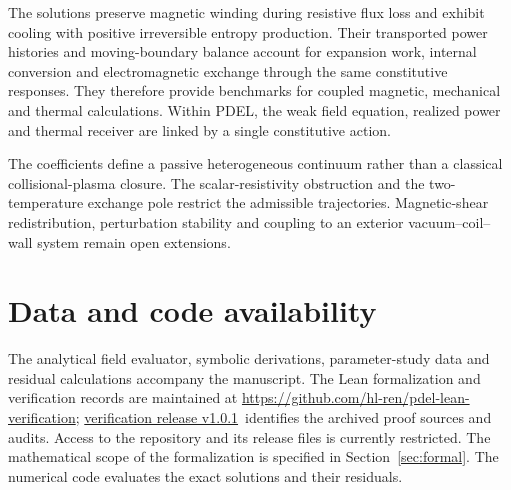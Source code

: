 \documentclass[11pt,a4paper]{article}
\theoremstyle{remark}\newtheorem{remark}{Remark}
\numberwithin{equation}{section}
\newcommand{\repositoryurl}{\url{https://github.com/hl-ren/pdel-lean-verification}}
\newcommand{\repositoryarchive}{\href{https://github.com/hl-ren/pdel-lean-verification/releases/tag/v1.0.1}{verification release v1.0.1}}
\begin{document}
The solutions preserve magnetic winding during resistive flux loss and exhibit cooling with positive irreversible entropy production. Their transported power histories and moving-boundary balance account for expansion work, internal conversion and electromagnetic exchange through the same constitutive responses. They therefore provide benchmarks for coupled magnetic, mechanical and thermal calculations. Within PDEL, the weak field equation, realized power and thermal receiver are linked by a single constitutive action.

The coefficients define a passive heterogeneous continuum rather than a classical collisional-plasma closure. The scalar-resistivity obstruction and the two-temperature exchange pole restrict the admissible trajectories. Magnetic-shear redistribution, perturbation stability and coupling to an exterior vacuum--coil--wall system remain open extensions.


\section*{Data and code availability}
The analytical field evaluator, symbolic derivations, parameter-study data and residual calculations accompany the manuscript. The Lean formalization and verification records are maintained at \repositoryurl; \repositoryarchive\ identifies the archived proof sources and audits. Access to the repository and its release files is currently restricted. The mathematical scope of the formalization is specified in Section~\ref{sec:formal}. The numerical code evaluates the exact solutions and their residuals.
\appendix
\end{document}
